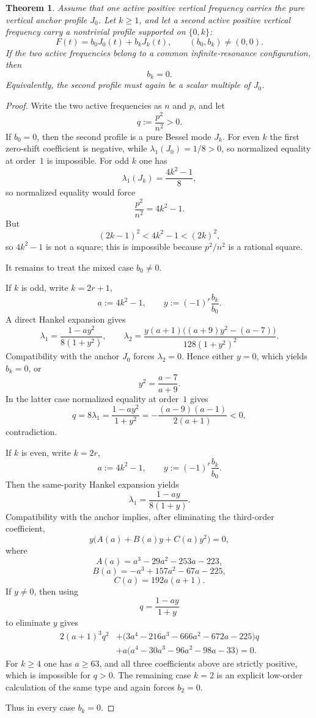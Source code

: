 \documentclass[11pt,reqno]{amsart}
\newtheorem{theorem}{Theorem}[section]
\theoremstyle{definition}
\begin{document}
\begin{theorem}\label{thm:anchor-support-two}
Assume that one active positive vertical frequency carries the pure vertical anchor profile
$J_0$. Let $k\ge 1$, and let a second active positive vertical frequency carry a nontrivial
profile supported on $\{0,k\}$:
\[
F(t)=b_0J_0(t)+b_kJ_k(t),
\qquad
(b_0,b_k)\neq (0,0).
\]
If the two active frequencies belong to a common infinite-resonance configuration, then
\[
b_k=0.
\]
Equivalently, the second profile must again be a scalar multiple of $J_0$.
\end{theorem}

\begin{proof}
Write the two active frequencies as $n$ and $p$, and let
\[
q:=\frac{p^2}{n^2}>0.
\]
If $b_0=0$, then the second profile is a pure Bessel mode $J_k$. For even $k$ the first
zero-shift coefficient is negative, while $\lambda_1(J_0)=1/8>0$, so normalized equality at
order~$1$ is impossible. For odd $k$ one has
\[
\lambda_1(J_k)=\frac{4k^2-1}{8},
\]
so normalized equality would force
\[
\frac{p^2}{n^2}=4k^2-1.
\]
But
\[
(2k-1)^2<4k^2-1<(2k)^2,
\]
so $4k^2-1$ is not a square; this is impossible because $p^2/n^2$ is a rational square.

It remains to treat the mixed case $b_0\neq 0$.

If $k$ is odd, write $k=2r+1$,
\[
a:=4k^2-1,
\qquad
y:=(-1)^r\frac{b_k}{b_0}.
\]
A direct Hankel expansion gives
\[
\lambda_1=\frac{1-ay^2}{8(1+y^2)},
\qquad
\lambda_2=
\frac{y(a+1)\bigl((a+9)y^2-(a-7)\bigr)}{128(1+y^2)^2}.
\]
Compatibility with the anchor $J_0$ forces $\lambda_2=0$. Hence either $y=0$, which yields
$b_k=0$, or
\[
y^2=\frac{a-7}{a+9}.
\]
In the latter case normalized equality at order~$1$ gives
\[
q=8\lambda_1=\frac{1-ay^2}{1+y^2}
=-\frac{(a-9)(a-1)}{2(a+1)}<0,
\]
contradiction.

If $k$ is even, write $k=2r$,
\[
a:=4k^2-1,
\qquad
y:=(-1)^r\frac{b_k}{b_0}.
\]
Then the same-parity Hankel expansion yields
\[
\lambda_1=\frac{1-ay}{8(1+y)}.
\]
Compatibility with the anchor implies, after eliminating the third-order coefficient,
\[
y\bigl(A(a)+B(a)y+C(a)y^2\bigr)=0,
\]
where
\[
A(a)=a^3-29a^2-253a-223,
\]
\[
B(a)=-a^3+157a^2-67a-225,
\]
\[
C(a)=192a(a+1).
\]
If $y\neq 0$, then using
\[
q=\frac{1-ay}{1+y}
\]
to eliminate $y$ gives
\[
\begin{aligned}
2(a+1)^3q^2
&+\bigl(3a^4-216a^3-666a^2-672a-225\bigr)q\\
&+a\bigl(a^4-30a^3-96a^2-98a-33\bigr)=0.
\end{aligned}
\]
For $k\ge 4$ one has $a\ge 63$, and all three coefficients above are strictly positive, which is
impossible for $q>0$. The remaining case $k=2$ is an explicit low-order calculation of the same
type and again forces $b_2=0$.

Thus in every case $b_k=0$.
\end{proof}
\end{document}
